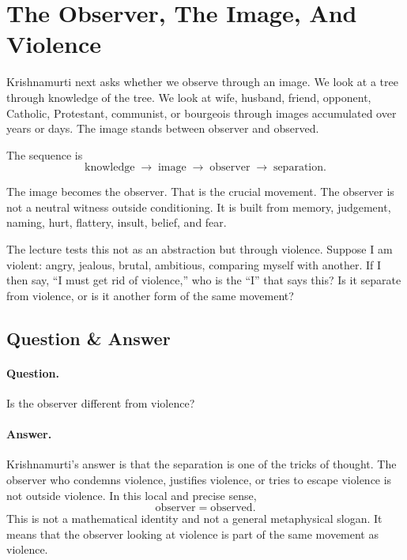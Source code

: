 \section{The Observer, The Image, And Violence}

Krishnamurti next asks whether we observe through an image. We look at a tree through knowledge of the tree. We look at wife, husband, friend, opponent, Catholic, Protestant, communist, or bourgeois through images accumulated over years or days. The image stands between observer and observed.

The sequence is
\begin{equation}
\text{knowledge}
\;\longrightarrow\;
\text{image}
\;\longrightarrow\;
\text{observer}
\;\longrightarrow\;
\text{separation}.
\end{equation}

The image becomes the observer. That is the crucial movement. The observer is not a neutral witness outside conditioning. It is built from memory, judgement, naming, hurt, flattery, insult, belief, and fear.

The lecture tests this not as an abstraction but through violence. Suppose I am violent: angry, jealous, brutal, ambitious, comparing myself with another. If I then say, ``I must get rid of violence,'' who is the ``I'' that says this? Is it separate from violence, or is it another form of the same movement?

\subsection{Question \& Answer}

\paragraph{Question.}
Is the observer different from violence?

\paragraph{Answer.}
Krishnamurti's answer is that the separation is one of the tricks of thought. The observer who condemns violence, justifies violence, or tries to escape violence is not outside violence. In this local and precise sense,
\begin{equation}
\text{observer} = \text{observed}.
\end{equation}
This is not a mathematical identity and not a general metaphysical slogan. It means that the observer looking at violence is part of the same movement as violence.

